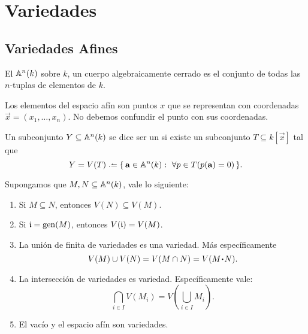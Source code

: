 \documentclass[12pt]{memoir}
\begin{document}

\chapter{Variedades}

\section{Variedades Afines}

\begin{Def}\label{def:espacio-afin}
El  $\mathbb{A}^n(k)$ sobre $k$, un cuerpo algebraicamente cerrado es el conjunto de todas las $n$-tuplas de elementos de $k$.
\end{Def}

Los elementos del espacio afín son puntos $x$ que se representan con coordenadas $\vec x=(x_1,\dots,x_n)$. No debemos confundir el punto con sus coordenadas.

\begin{Def}\label{def:conj-algebraico}
   Un subconjunto $Y\subseteq\mathbb{A}^n(k)$ se dice ser un  si existe un subconjunto $T\subseteq k[\vec x]$ tal que 
   $$Y=V(T)\defeq\set{\vec a\in\bA^n(k):\ \forall p\in T(p(\vec a)=0)}.$$
\end{Def}

\begin{Prop}\label{prop:propiedades-variedades}
  Supongamos que $M,N\subseteq\mathbb{A}^n(k)$, vale lo siguiente:
  \begin{enumerate}
    \item Si $M\subseteq N$, entonces $V(N)\subseteq V(M)$.
    \item Si $\mathfrak{i} =\operatorname{gen}(M)$, entonces $V(\mathfrak{i})=V(M)$.
    \item La unión de finita de variedades es una variedad. Más específicamente 
    $$V(M)\cup V(N)=V(M\cap N)=V(M\.N).$$
    \item La intersección de variedades es variedad. Específicamente vale:
    $$\bigcap_{i\in I}V(M_i)=V\left(\bigcup_{i\in I}M_i\right).$$
    \item El vacío y el espacio afín son variedades.
  \end{enumerate}
\end{Prop}
\end{document}
